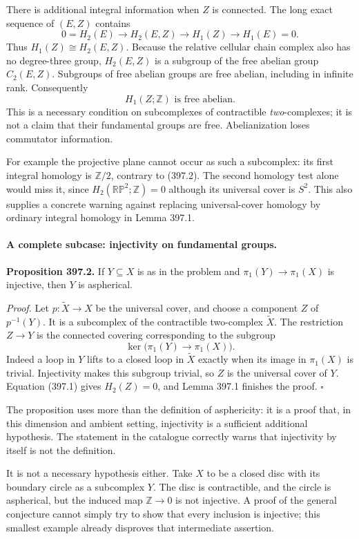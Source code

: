 \documentclass[11pt]{article}
\begin{document}
There is additional integral information when $Z$ is connected. The
long exact sequence of $(E,Z)$ contains
\[
 0=H_2(E)\longrightarrow H_2(E,Z)
 \longrightarrow H_1(Z)\longrightarrow H_1(E)=0.
\]
Thus $H_1(Z)\cong H_2(E,Z)$. Because the relative cellular chain
complex also has no degree-three group, $H_2(E,Z)$ is a subgroup of
the free abelian group $C_2(E,Z)$. Subgroups of free abelian groups
are free abelian, including in infinite rank. Consequently
\[
 H_1(Z;\mathbb Z)\text{ is free abelian}.
 \tag{397.2}
\]
This is a necessary condition on subcomplexes of contractible
\emph{two}-complexes; it is not a claim that their fundamental groups
are free. Abelianization loses commutator information.

For example the projective plane cannot occur as such a subcomplex:
its first integral homology is $\mathbb Z/2$, contrary to (397.2).
The second homology test alone would miss it, since
$H_2(\mathbb{RP}^2;\mathbb Z)=0$ although its universal cover is $S^2$.
This also supplies a concrete warning against replacing universal-cover
homology by ordinary integral homology in Lemma 397.1.

\paragraph{A complete subcase: injectivity on fundamental groups.}
\textbf{Proposition 397.2.} If $Y\subseteq X$ is as in the problem
and $\pi_1(Y)\to\pi_1(X)$ is injective, then $Y$ is aspherical.

\emph{Proof.} Let $p:\widetilde X\to X$ be the universal cover,
and choose a component $Z$ of $p^{-1}(Y)$. It is a subcomplex of the
contractible two-complex $\widetilde X$. The restriction $Z\to Y$
is the connected covering corresponding to the subgroup
\[
 \ker\bigl(\pi_1(Y)\to\pi_1(X)\bigr).
\]
Indeed a loop in $Y$ lifts to a closed loop in $\widetilde X$ exactly
when its image in $\pi_1(X)$ is trivial. Injectivity makes this
subgroup trivial, so $Z$ is the universal cover of $Y$.
Equation (397.1) gives $H_2(Z)=0$, and Lemma 397.1 finishes the proof.
\hfill$\square$

The proposition uses more than the definition of asphericity: it is
a proof that, in this dimension and ambient setting, injectivity is
a sufficient additional hypothesis. The statement in the catalogue
correctly warns that injectivity by itself is not the definition.

It is not a necessary hypothesis either. Take $X$ to be a closed disc
with its boundary circle as a subcomplex $Y$. The disc is contractible,
and the circle is aspherical, but the induced map
$\mathbb Z\to0$ is not injective. A proof of the general conjecture
cannot simply try to show that every inclusion is injective; this
smallest example already disproves that intermediate assertion.
\end{document}
